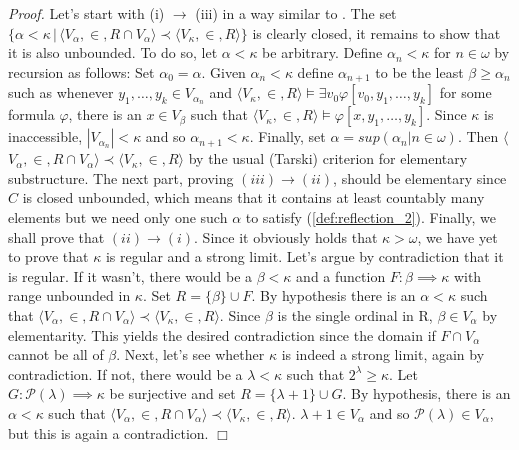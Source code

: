 \documentclass[12pt,a4paper]{article}
\newenvironment{proof}
{\noindent \textit{Proof.}}
{\hspace*{\fill} $\Box$}
\newcommand{\power}[1]{\ensuremath{\mathscr{P}} (#1)}
\newcommand{\set}[2]{\ensuremath{\{#1 \,|\, #2 \}}}
\newcommand{\el}{\prec}
\newcommand{\then}{\rightarrow}
\begin{document}
\begin{proof}
Let's start with (i) $\then$ (iii) in a way similar to \cite{KanamoriBook}.\newline
The set $\set{\alpha<\kappa}{\langle V_\alpha,\in,R \cap V_\alpha \rangle \el \langle V_\kappa,\in,R\rangle}$ is clearly closed, it remains to show that it is also unbounded.
To do so, let $\alpha<\kappa$ be arbitrary. Define $\alpha_n < \kappa$ for $n\in\omega$ by recursion as follows:\newline
Set $\alpha_0=\alpha$. Given $\alpha_n < \kappa$ define $\alpha_{n+1}$ to be the least $\beta \geq \alpha_n$ such as 
whenever $y_1,\ldots,y_k \in V_{\alpha_n}$ and
$\langle V_{\kappa}, \in, R \rangle \models \exists v_0 \varphi [v_0, y_1, \ldots, y_k ]$
for some formula $\varphi$, there is an $x \in V_{\beta}$ such that $\langle V_{\kappa}, \in, R\rangle \models \varphi [x, y_1, \ldots, y_k]$.
\newline
Since $\kappa$ is inaccessible, $|V_{\alpha_n}| < \kappa$ and so $\alpha_{n+1} < \kappa$.\newline
Finally, set $\alpha = sup({\alpha_n | n \in \omega})$. 
Then $\langle$
 $V_ \alpha, \in, R  \cap V_\alpha \rangle \prec \langle V_{\kappa}, \in, R\rangle$ by the usual (Tarski) criterion for elementary substructure.
 \newline\newline
 The next part, proving $(iii) \then (ii)$, should be elementary since $C$ is closed unbounded, which means that it contains at least countably many elements but we need only one such $\alpha$ to satisfy (\ref{def:reflection_2}).
 \newline
 Finally, we shall prove that $(ii) \then (i)$. Since it obviously holds that $\kappa > \omega$, we have yet to prove that $\kappa$ is regular and a strong limit. Let's argue by contradiction that it is regular. 
 If it wasn't, there would be a $\beta < \kappa$ and a function $F: \beta \implies \kappa$ with range unbounded in $\kappa$. Set $R = \{\beta\} \cup F$. By hypothesis there is an $\alpha < \kappa$ such that $\langle V_\alpha, \in, R \cap V_\alpha \rangle \prec \langle V_\kappa, \in, R \rangle$. Since $\beta$ is the single ordinal in R, $\beta \in V_\alpha$ by elementarity. This yields the desired contradiction since the domain if $F \cap V_\alpha$ cannot be all of $\beta$.
 \newline\newline
 Next, let's see whether $\kappa$ is indeed a strong limit, again by contradiction. If not, there would be a $\lambda < \kappa$ such that $2^\lambda \geq \kappa$. Let $G: \power{\lambda} \implies \kappa$ be surjective and set $R = \{\lambda + 1\} \cup G$. By hypothesis, there is an $\alpha < \kappa$ such that $\langle V_\alpha, \in, R \cap V_\alpha \rangle \prec \langle V_\kappa, \in, R \rangle$. $\lambda + 1 \in V_\alpha$ and so $\power{\lambda} \in V_\alpha$, but this is again a contradiction.
\end{proof}
\end{document}

